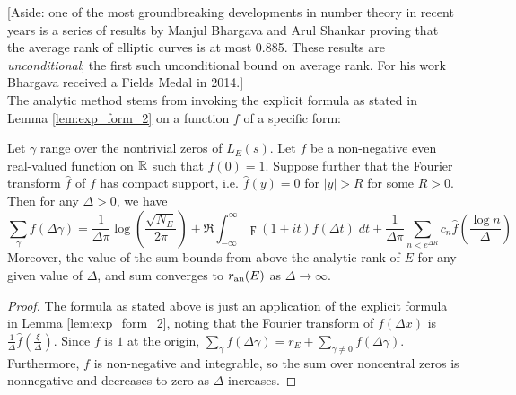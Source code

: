 [Aside: one of the most groundbreaking developments in number theory in recent years is a series of results by Manjul Bhargava and Arul Shankar \cite{BhSh-2010a} \cite{BhSh-2010b} \cite{BhSh-2013} proving that the average rank of elliptic curves is at most 0.885. These results are {\it unconditional}; the first such unconditional bound on average rank. For his work Bhargava received a Fields Medal in 2014.] \\

The analytic method stems from invoking the explicit formula as stated in Lemma \ref{lem:exp_form_2} on a function $f$ of a specific form:
\begin{lemma}[GRH]\label{lem:exp_form_nonneg_f_cpt_suppt}
Let $\gamma$ range over the nontrivial zeros of $L_E(s)$. Let $f$ be a non-negative even real-valued function on $\mathbb{R}$ such that $f(0)=1$. Suppose further that the Fourier transform $\hat{f}$ of $f$ has compact support, i.e. $\hat{f}(y) = 0$ for $|y|>R$ for some $R>0$. Then for any $\Delta>0$, we have
\begin{equation}
\sum_{\gamma} f(\Delta \gamma) = \frac{1}{\Delta \pi}\log\left(\frac{\sqrt{N_E}}{2\pi}\right) + \Re\int_{-\infty}^{\infty} \digamma(1+it)f(\Delta t) \; dt  + \frac{1}{\Delta \pi}\sum_{n<e^{\Delta R}} c_n \hat{f}\left(\frac{\log n}{\Delta}\right)
\end{equation}
Moreover, the value of the sum bounds from above the analytic rank of $E$ for any given value of $\Delta$, and sum converges to $r_{{\rm an}}(E)$ as $\Delta \to \infty$.
\end{lemma}

\begin{proof}
The formula as stated above is just an application of the explicit formula in Lemma \ref{lem:exp_form_2}, noting that the Fourier transform of $f(\Delta x)$ is $\frac{1}{\Delta}\hat{f}\left(\frac{\xi}{\Delta}\right)$. Since $f$ is $1$ at the origin, $\sum_{\gamma} f(\Delta \gamma) = r_E + \sum_{\gamma\ne 0} f(\Delta \gamma)$. Furthermore, $f$ is non-negative and integrable, so the sum over noncentral zeros is nonnegative and decreases to zero as $\Delta$ increases.
\end{proof}

